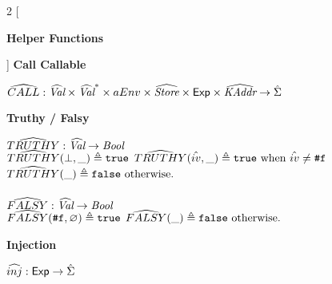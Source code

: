 \documentclass[12pt,draft]{article}
\newcommand{\falsesyn}{\texttt{\#f}}
\begin{document}
\newpage

\begin{multicols*}{2}
  [
  \begin{center}
    \textbf{Helper Functions}
  \end{center}
  ]
  \noindent\textbf{Call Callable}
  \begin{center}
    $\widehat{CALL} : \widehat{\textit{Val}} \times \widehat{\textit{Val}}^* \times aEnv
    \times \widehat{\textit{Store}} \times \textsf{Exp} \times \widehat{\textit{KAddr}} \rightarrow \hat{\Sigma}$
  \end{center}
  \textbf{Truthy / Falsy}
  \begin{center}
    $\widehat{TRUTHY} : \widehat{\textit{Val}} \rightarrow \textit{Bool}$ \\
    $\widehat{TRUTHY}(\bot , \_) \triangleq \texttt{true}$
    $\aTRUTHY(\aival , \_) \triangleq \texttt{true} \text{ when } \aival \neq
    \falsesyn$
    $\widehat{TRUTHY}(\_) \triangleq \texttt{false} \text{ otherwise.}$ \\ \; \\
    $\widehat{FALSY} : \widehat{\textit{Val}} \rightarrow \textit{Bool}$ \\
    $\aFALSY(\falsesyn , \varnothing) \triangleq \texttt{true}$
    $\widehat{FALSY}(\_) \triangleq \texttt{false} \text{ otherwise.}$
  \end{center}
  \vfill\null
  \columnbreak
  \noindent \textbf{Injection} \\
  \vspace{-7mm}
  \begin{center}
    $\widehat{inj} : \textsf{Exp} \rightarrow \hat{\Sigma}$ \\

\end{center}
\end{multicols*}
\end{document}
